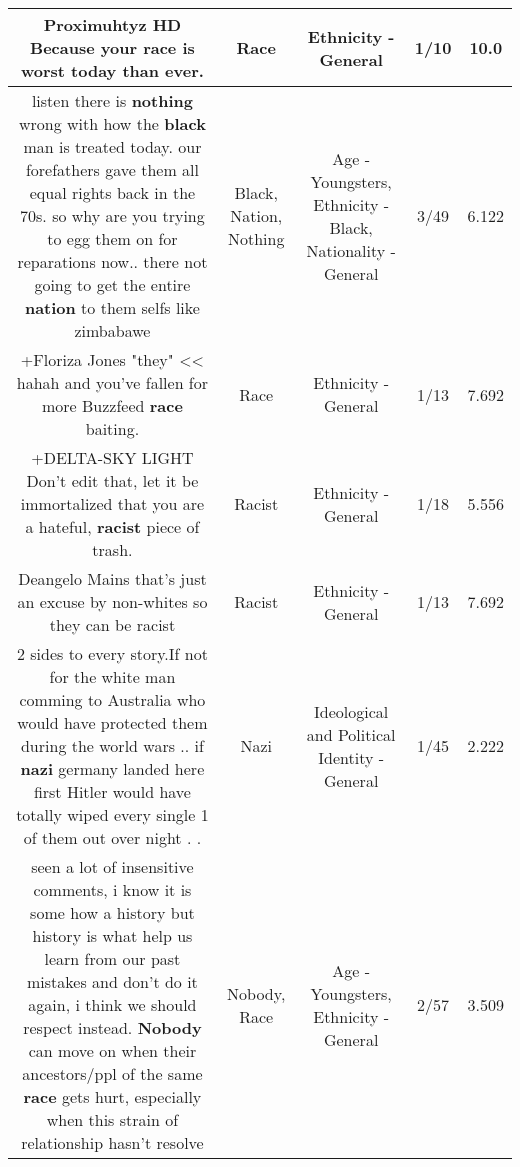 \documentclass[11pt]{article}
\newlength\mylength
\begin{document}
\begin{center}
\begin{longtable}{|C{.65\mylength}|C{.30\mylength}|C{.12\mylength}|C{.12\mylength}|C{.12\mylength}|}
  \small Proximuhtyz HD Because your \textbf{race} is worst today than ever.\normalsize   & Race & Ethnicity - General & 1/10 & 10.0 \\  \hline
  \small listen there is \textbf{nothing} wrong with how the \textbf{black} man is treated today. our forefathers gave them all equal rights back in the 70s. so why are you trying to egg them on for reparations now.. there not going to get the entire \textbf{nation} to them selfs like zimbabawe\normalsize   & Black, Nation, Nothing & Age - Youngsters, Ethnicity - Black, Nationality - General & 3/49 & 6.122 \\  \hline
  \small +Floriza Jones "they" << hahah and you've fallen for more Buzzfeed \textbf{race} baiting.\normalsize   & Race & Ethnicity - General & 1/13 & 7.692 \\  \hline
  \small +DELTA-SKY LIGHT  Don't edit that, let it be immortalized that you are a hateful, \textbf{racist} piece of trash.\normalsize   & Racist & Ethnicity - General & 1/18 & 5.556 \\  \hline
  \small Deangelo Mains that's just an excuse by non-whites so they can be racist\normalsize   & Racist & Ethnicity - General & 1/13 & 7.692 \\  \hline
  \small 2 sides to every story.If not for the white man comming to Australia who would have protected them during the world wars .. if \textbf{nazi} germany landed here first Hitler would have totally wiped every single 1 of them out over night . .\normalsize   & Nazi &  Ideological and Political Identity - General & 1/45 & 2.222 \\  \hline
  \small seen a lot of insensitive comments, i know it is some how a history but history is what help us learn from our past mistakes and don't do it again, i think we should respect instead. \textbf{Nobody} can move on when their ancestors/ppl of the same \textbf{race} gets hurt, especially when this strain of relationship hasn't resolve\normalsize   & Nobody, Race & Age - Youngsters, Ethnicity - General & 2/57 & 3.509 \\  \hline

\end{longtable}
\end{center}
\end{document}
